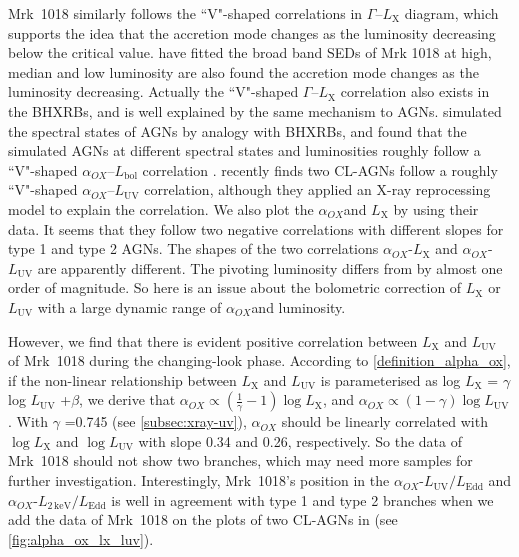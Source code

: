 \documentclass[twocolumn]{aastex63}
\newcommand{\alphaox}{$\alpha_{OX}$}
\begin{document}
Mrk~1018 similarly follows the ``V"-shaped correlations in $\Gamma$--$L_\mathrm{X}$ diagram, which supports the idea that the accretion mode changes as the luminosity decreasing below the critical value. \citet{2018MNRAS.480.3898N} have fitted the broad band SEDs of Mrk 1018 at high, median and low luminosity are also found the accretion mode changes as the luminosity decreasing. Actually the ``V"-shaped $\Gamma$--$L_\mathrm{X}$ correlation also exists in the BHXRBs, and is well explained by the same mechanism to AGNs\citep[e.g.][]{2011A&A...530A.149Y,2015MNRAS.447.1692Y}. \citet{2011MNRAS.413.2259S} simulated the spectral states of AGNs by analogy with BHXRBs, and found that the simulated AGNs at different spectral states and luminosities roughly follow a ``V"-shaped \alphaox--$L_\mathrm{bol}$ correlation \citep[see also in ][]{2019ApJ...883...76R}. \citet{2019arXiv190904676R} recently finds two CL-AGNs follow a roughly ``V"-shaped \alphaox--$L_\mathrm{UV}$ correlation, although they applied an X-ray reprocessing model to explain the correlation. We also plot the \alphaox and $L_\mathrm{X}$ by using their data. It seems that they follow two negative correlations with different slopes for type 1 and type 2 AGNs. The shapes of the two correlations \alphaox-$L_\mathrm{X}$ and \alphaox-$L_\mathrm{UV}$ are apparently different. The pivoting luminosity differs from \citet{2011ApJ...739...64X} by almost one order of magnitude. So here is an issue about the bolometric correction of $L_\mathrm{X}$ or $L_\mathrm{UV}$ with a large dynamic range of \alphaox and luminosity. 

 However, we find that there is evident positive correlation between $L_\mathrm{X}$ and $L_\mathrm{UV}$ of Mrk~1018 during the changing-look phase. According to \autoref{definition_alpha_ox}, if the non-linear relationship between $ L_{\mathrm{X}}$ and $ L_\mathrm{UV}$ is parameterised as log $L_\mathrm{X}$ = $\gamma $ log $L_{\mathrm{UV}} $ +$\beta$, we derive that $\alpha_{OX}\propto (\frac{1}{\gamma}-1) \log L_\mathrm{X}$, and $\alpha_{OX}\propto (1-\gamma) \log L_\mathrm{UV}$. With $\gamma$ =0.745 (see \autoref{subsec:xray-uv}), $\alpha_{OX}$ should be linearly correlated with $\log L_\mathrm{X}$ and $\log L_\mathrm{UV}$ with slope 0.34 and 0.26, respectively. So the data of Mrk~1018 should not show two branches, which may need more samples for further investigation. Interestingly, Mrk~1018's position in the \alphaox-$L_\mathrm{UV}/L_\mathrm{Edd}$ and \alphaox-$L_\mathrm{2\,keV}/L_\mathrm{Edd}$ is well in agreement with type 1 and type 2 branches when we add the data of Mrk~1018 on the plots of two CL-AGNs in \citet{2019arXiv190904676R} (see \autoref{fig:alpha_ox_lx_luv}).
 
\end{document}
